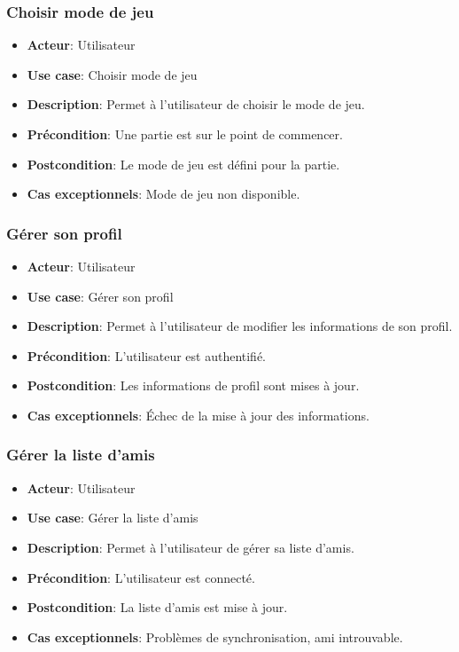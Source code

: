 \documentclass{article}
\begin{document}
\subsubsection{Choisir mode de jeu}
\begin{itemize}
    \item \textbf{Acteur}: Utilisateur
    \item \textbf{Use case}: Choisir mode de jeu
    \item \textbf{Description}: Permet à l'utilisateur de choisir le mode de jeu.
    \item \textbf{Précondition}: Une partie est sur le point de commencer.
    \item \textbf{Postcondition}: Le mode de jeu est défini pour la partie.
    \item \textbf{Cas exceptionnels}: Mode de jeu non disponible.
\end{itemize}

\subsubsection{Gérer son profil}
\begin{itemize}
    \item \textbf{Acteur}: Utilisateur
    \item \textbf{Use case}: Gérer son profil
    \item \textbf{Description}: Permet à l'utilisateur de modifier les informations de son profil.
    \item \textbf{Précondition}: L'utilisateur est authentifié.
    \item \textbf{Postcondition}: Les informations de profil sont mises à jour.
    \item \textbf{Cas exceptionnels}: Échec de la mise à jour des informations.
\end{itemize}

\subsubsection{Gérer la liste d'amis}
\begin{itemize}
    \item \textbf{Acteur}: Utilisateur
    \item \textbf{Use case}: Gérer la liste d'amis
    \item \textbf{Description}: Permet à l'utilisateur de gérer sa liste d'amis.
    \item \textbf{Précondition}: L'utilisateur est connecté.
    \item \textbf{Postcondition}: La liste d'amis est mise à jour.
    \item \textbf{Cas exceptionnels}: Problèmes de synchronisation, ami introuvable.
\end{itemize}
\end{document}
